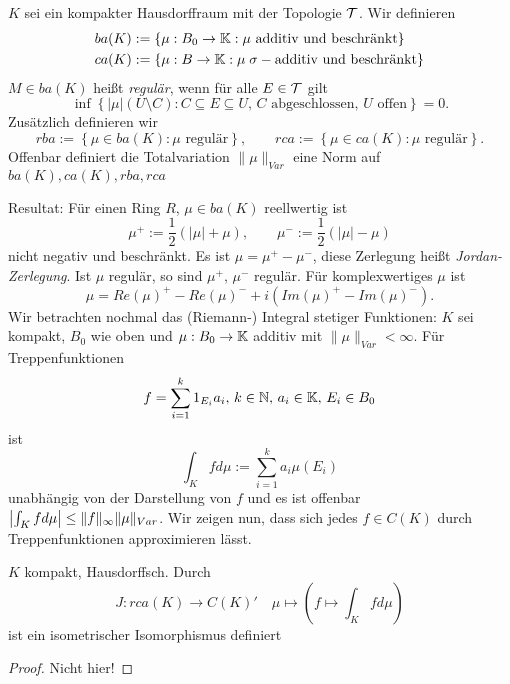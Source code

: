 \documentclass[ngerman]{report}
\begin{document}
	\begin{definition}
	$K$ sei ein kompakter Hausdorffraum mit der Topologie $\mathcal{T}$. Wir definieren
	\begin{equation*}
		\begin{split}
		& ba(K) := \{\mu : B_0 \to \mathbb{K} : \mu \text{ additiv und beschränkt} \}\\
		& ca(K) := \{\mu : B \to \mathbb{K} : \mu\; \sigma-\text{additiv und beschränkt} \}
		\end{split}
	\end{equation*}
		$M\in ba(K)$ heißt \textit{regulär}, wenn für alle $E\in \mathcal{T}$ gilt
		$$\inf \left\lbrace |\mu| (U\setminus C) : C\subseteq E \subseteq U,\, C \text{ abgeschlossen, } U \text{ offen} \right\rbrace = 0.$$
		Zusätzlich definieren wir
		$$rba := \left\lbrace \mu \in ba(K) : \mu \text{ regulär}\right\rbrace,\qquad 
		rca := \left\lbrace \mu \in ca(K) : \mu \text{ regulär}\right\rbrace. $$
		Offenbar definiert die Totalvariation $\|\mu \|_{Var}$ eine Norm auf $ba(K), ca(K), rba, rca$
	\end{definition}	
	
	Resultat: Für einen Ring $R$, $\mu \in ba(K)$ reellwertig ist 
	$$\mu^+:=\frac{1}{2}(|\mu| + \mu),\qquad \mu^-:=\frac{1}{2}(|\mu| - \mu)$$
	nicht negativ und beschränkt.
	Es ist $\mu = \mu^+ - \mu^-$, diese Zerlegung heißt \textit{Jordan-Zerlegung}.
	Ist $\mu$ regulär, so sind $\mu^+,\,\mu^-$ regulär.
	Für komplexwertiges $\mu$ ist
	$$\mu = Re(\mu)^+ - Re(\mu)^- + i(Im(\mu)^+ -Im(\mu)^-).$$
	Wir betrachten nochmal das (Riemann-) Integral stetiger Funktionen:
	$K$ sei kompakt, $B_0$ wie oben und $\mu : B_0 \to \mathbb{K}$ additiv mit $\|\mu \|_{Var} < \infty$. Für Treppenfunktionen 
	$$f = \sum^k_{i=1} 1_{E_i} a_i,\, k\in\mathbb{N},\,a_i\in\mathbb{K},\,E_i\in B_0$$ 
	ist 
	$$\int_K f d\mu := \sum^k_{i=1} a_i \mu(E_i)$$
	unabhängig von der Darstellung von $f$ und es ist offenbar $\left\lvert \int_K fd\mu \right\rvert \leq \|f\|_\infty \|\mu \|_{Var}$. 
	Wir zeigen nun, dass sich jedes $f \in C(K)$ durch Treppenfunktionen approximieren lässt.
	
	\begin{thm}
		$K$ kompakt, Hausdorffsch. Durch
			$$ J: rca(K) \to C(K)' \quad \mu \mapsto (f\mapsto \int_K f d\mu)$$
		ist ein isometrischer Isomorphismus definiert
	\end{thm}
	
	\begin{proof}
		Nicht hier!
	\end{proof}
\end{document}
